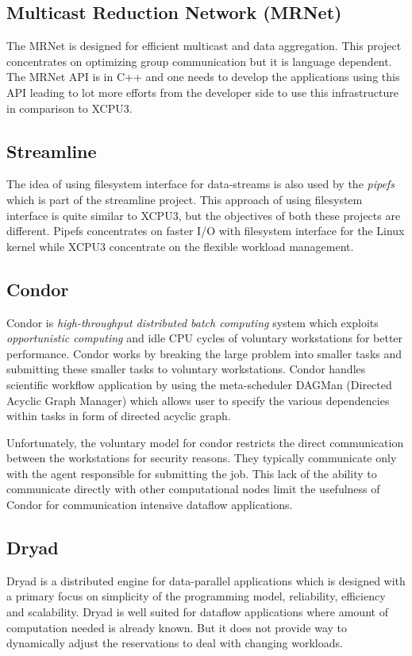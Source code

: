 \documentclass[conference]{IEEEtran}
\begin{document}
\subsection{Multicast Reduction Network (MRNet)}
The MRNet\cite{MRNet} is designed for efficient multicast and data aggregation.
This project concentrates on optimizing group communication but it is language
dependent.  The MRNet API is in C++ and one needs to develop the applications
using this API leading to lot more efforts from the developer side to use this
infrastructure in comparison to XCPU3.

\subsection{Streamline}
The idea of using filesystem interface for data-streams is also used by the
\textit{pipefs}\cite{1400104} which is part of the streamline\cite{streamline}
project.  This approach of using filesystem interface is quite similar to
XCPU3, but the objectives of both these projects are different. Pipefs
concentrates on faster I/O with filesystem interface for the Linux kernel
while XCPU3 concentrate on the flexible workload management.

\subsection{Condor}
Condor\cite{condor-practice} is \textit{high-throughput distributed batch
computing} system which exploits \textit{opportunistic computing} and idle CPU
cycles of voluntary workstations for better performance.  Condor works by
breaking the large problem into smaller tasks and submitting these smaller
tasks to voluntary workstations. Condor handles scientific workflow
application by using the meta-scheduler DAGMan (Directed Acyclic Graph Manager)
which allows user to specify the various dependencies within tasks in form of
directed acyclic graph. 

Unfortunately, the voluntary model for condor restricts the direct communication
between the workstations for security reasons.  They typically communicate
only with the agent responsible for submitting the job.  This lack of the
ability to communicate directly with other computational nodes limit the
usefulness of Condor for communication intensive dataflow applications.


\subsection{Dryad}
Dryad\cite{yu2008dsg} is a distributed engine for data-parallel applications
which is designed with a primary focus on simplicity of the programming model,
reliability, efficiency and scalability.  Dryad is well suited for dataflow
applications where amount of computation needed is already known.  But it does
not provide way to dynamically adjust the reservations to deal with changing
workloads.    
\end{document}
